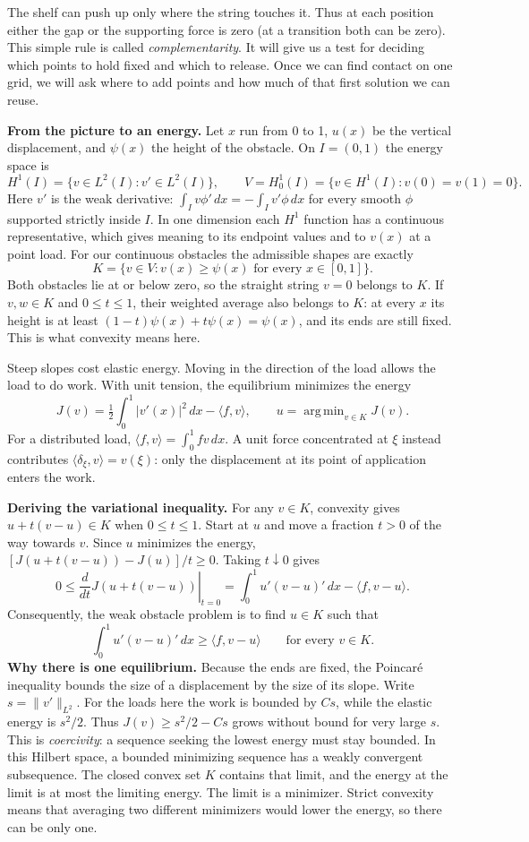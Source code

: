 \documentclass[11pt,a4paper]{article}
\newcommand{\ip}[2]{\langle #1,#2\rangle}
\DeclareMathOperator*{\argmin}{arg\,min}
\begin{document}
The shelf can push up only where the string touches it. Thus at each position either the gap or the supporting force is zero (at a transition both can be zero). This simple rule is called \emph{complementarity}. It will give us a test for deciding which points to hold fixed and which to release. Once we can find contact on one grid, we will ask where to add points and how much of that first solution we can reuse.

\textbf{From the picture to an energy.} Let $x$ run from 0 to 1,
$u(x)$ be the vertical displacement, and $\psi(x)$ the height of the obstacle.
On $I=(0,1)$ the energy space is
\[
 H^1(I)=\{v\in L^2(I):v'\in L^2(I)\},\qquad
 V=H^1_0(I)=\{v\in H^1(I):v(0)=v(1)=0\}.
\]
Here $v'$ is the weak derivative: $\int_I v\phi'\,dx=-\int_I v'\phi\,dx$ for every smooth $\phi$ supported strictly inside $I$. In one dimension each $H^1$ function has a continuous representative, which gives meaning to its endpoint values and to $v(x)$ at a point load. For our continuous obstacles the admissible shapes are exactly
\[
 K=\{v\in V:v(x)\geq\psi(x)\text{ for every }x\in[0,1]\}.
\]
Both obstacles lie at or below zero, so the straight string $v=0$ belongs to $K$. If $v,w\in K$ and $0\le t\le1$, their weighted average also belongs to $K$: at every $x$ its height is at least $(1-t)\psi(x)+t\psi(x)=\psi(x)$, and its ends are still fixed. This is what convexity means here.

Steep slopes cost elastic energy. Moving in the direction of the load allows the load to do work. With unit tension, the equilibrium minimizes the energy
\[
 J(v)=\tfrac12\int_0^1|v'(x)|^2\,dx-\ip{f}{v},\qquad u=\argmin_{v\in K}J(v).
\]
For a distributed load, $\ip{f}{v}=\int_0^1fv\,dx$. A unit force concentrated at $\xi$ instead contributes $\ip{\delta_\xi}{v}=v(\xi)$: only the displacement at its point of application enters the work.

\textbf{Deriving the variational inequality.} For any $v\in K$, convexity gives $u+t(v-u)\in K$ when $0\leq t\leq1$. Start at $u$ and move a fraction $t>0$ of the way towards $v$. Since $u$ minimizes the energy, $[J(u+t(v-u))-J(u)]/t\geq0$. Taking $t\downarrow0$ gives
\[
 0\leq\left.\frac{d}{dt}J(u+t(v-u))\right|_{t=0}
 =\int_0^1 u'(v-u)'\,dx-\ip{f}{v-u}.
\]
Consequently, the weak obstacle problem is to find $u\in K$ such that
\begin{equation}\label{eq:VI}
 \boxed{\int_0^1u'(v-u)'\,dx\geq\ip{f}{v-u}\qquad\text{for every }v\in K.}
\end{equation}
\textbf{Why there is one equilibrium.} Because the ends are fixed, the Poincar\'e inequality bounds the size of a displacement by the size of its slope. Write $s=\|v'\|_{L^2}$. For the loads here the work is bounded by $Cs$, while the elastic energy is $s^2/2$. Thus $J(v)\geq s^2/2-Cs$ grows without bound for very large $s$. This is \emph{coercivity}: a sequence seeking the lowest energy must stay bounded. In this Hilbert space, a bounded minimizing sequence has a weakly convergent subsequence. The closed convex set $K$ contains that limit, and the energy at the limit is at most the limiting energy. The limit is a minimizer. Strict convexity means that averaging two different minimizers would lower the energy, so there can be only one.
\end{document}
